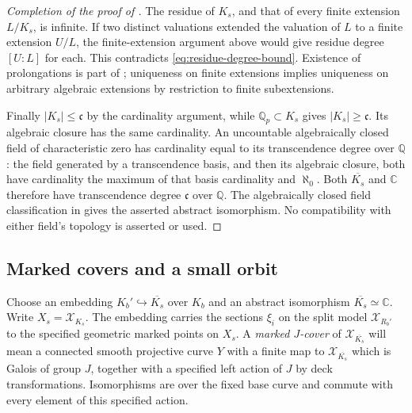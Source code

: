 \begin{proof}[Completion of the proof of ]
The residue of $K_s$, and that of every finite extension $L/K_s$, is
infinite.  If two distinct valuations extended the valuation of $L$ to
a finite extension $U/L$, the finite-extension argument above would
give residue degree $[U:L]$ for each.  This contradicts
\eqref{eq:residue-degree-bound}.  Existence of prolongations is part of
; uniqueness on finite extensions implies
uniqueness on arbitrary algebraic extensions by restriction to finite
subextensions.

Finally $|K_s|\leq\mathfrak c$ by the cardinality argument, while
$\mathbb Q_p\subset K_s$ gives $|K_s|\geq\mathfrak c$.
Its algebraic closure has the same cardinality.
An uncountable algebraically closed field of characteristic zero has
cardinality equal to its transcendence degree over $\mathbb Q$: the
field generated by a transcendence basis, and then its algebraic
closure, both have cardinality the maximum of that basis cardinality
and $\aleph_0$.  Both $\overline{K_s}$ and $\mathbb C$ therefore have
transcendence degree $\mathfrak c$ over $\mathbb Q$.
The algebraically closed field classification in
 gives the asserted abstract isomorphism.
No compatibility with either field's topology is asserted or used.
\end{proof}

\subsection{Marked covers and a small orbit}

Choose an embedding $K_b'\hookrightarrow\overline{K_s}$ over $K_b$ and
an abstract isomorphism $\overline{K_s}\simeq\mathbb C$.
Write $X_s=\mathcal X_{K_s}$. The embedding carries the sections
$\xi_i$ on the split model $\mathcal X_{R_b'}$ to the specified
geometric marked points on $X_s$.
A \emph{marked $J$-cover} of $\mathcal X_{\overline{K_s}}$ will mean a connected
smooth projective curve $Y$ with a finite map to $\mathcal X_{\overline{K_s}}$
which is Galois of group $J$, together with a specified left action of
$J$ by deck transformations.  Isomorphisms are over the fixed base
curve and commute with every element of this specified action.

